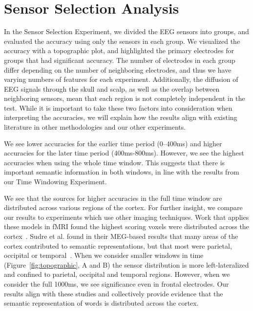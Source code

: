 \section{Sensor Selection Analysis}
In the Sensor Selection Experiment, we divided the EEG sensors into groups, and 
evaluated the \tvt accuracy using only the sensors in each group. We visualized 
the \tvt accuracy with a topographic plot, and highlighted the primary 
electrodes for groups that had significant accuracy. The number of electrodes 
in each group differ depending on the number of neighboring electrodes, and 
thus we have varying numbers of features for each \tvt experiment. 
Additionally, the diffusion of EEG signals through the skull and scalp, as well 
as the overlap between neighboring sensors, mean that each region is not 
completely independent in the \tvt test. While it is important to take these 
two factors into consideration when interpreting the accuracies, we will 
explain how the results align with existing literature in other methodologies 
and our other experiments.

We see lower \tvt accuracies for the earlier time period (0--400ms) and higher 
accuracies for the later time period (400ms-800ms). However, we see the highest 
accuracies when using the whole time window. This suggests that there is 
important semantic information in both windows, in line with the results from 
our Time Windowing Experiment.

We see that the sources for higher accuracies in the full time window are 
distributed across various regions of the cortex. For further insight, we 
compare our results to experiments which use other imaging techniques. Work 
that applies these models in fMRI found the highest scoring voxels were 
distributed across the cortex~\cite{Mitchell2008, pereira2018toward}. Sudre et 
al. found in their MEG-based results that many areas of the cortex contributed 
to semantic representations, but that most were parietal, occipital or 
temporal~\cite{Sudre2012}. When we consider smaller windows in time 
(Figure~\ref{fig:topographic}, A and B) the sensor distribution is more 
left-lateralized and confined to parietal, occipital and temporal regions.  
However, when we consider the full 1000ms, we see significance even in frontal 
electrodes.  Our results align with these studies and collectively provide 
evidence that the semantic representation of words is distributed across the 
cortex. 
